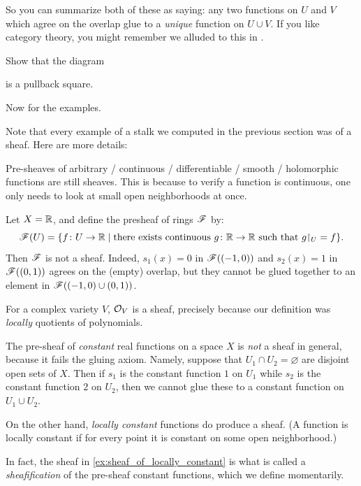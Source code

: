 So you can summarize both of these as saying:
any two functions on $U$ and $V$
which agree on the overlap
glue to a \emph{unique} function on $U \cup V$.
If you like category theory,
you might remember we alluded to this in .
\begin{exercise}
	Show that the diagram
	\begin{center}
	\end{center}
	is a pullback square.
\end{exercise}

Now for the examples.
\begin{example}
	Note that every example of a stalk we computed
	in the previous section was of a sheaf.
	Here are more details:
	\begin{enumerate}[(a)]
		\ii Pre-sheaves of arbitrary / continuous / differentiable / smooth
		/ holomorphic functions are still sheaves.
		This is because to verify a function is continuous,
		one only needs to look at small open neighborhoods at once.

		\ii Let $X = \mathbb R$, and define the presheaf of rings $\mathscr F$ by:
		\[
			\SF(U) = \{ f \colon U \to \RR \mid \text{there exists continuous $g
			\colon \RR \to \RR$ such that $g\restrict{U} = f$} \}.
		\]
		Then $\mathscr F$ is not a sheaf. Indeed, $s_1(x) = 0$ in $\mathscr F((-1, 0))$
		and $s_2(x) = 1$ in $\mathscr F((0, 1))$ agrees on the (empty) overlap,
		but they cannot be glued together to an element in $\mathscr F((-1, 0) \cup(0,
		1))$.

		\ii For a complex variety $V$, $\mathcal O_V$ is a sheaf,
		precisely because our definition was \emph{locally} quotients
		of polynomials.

		\ii The pre-sheaf of \emph{constant} real functions on a space $X$
		is \emph{not} a sheaf in general, because it fails the gluing axiom.
		Namely, suppose that $U_1 \cap U_2 = \varnothing$
		are disjoint open sets of $X$.
		Then if $s_1$ is the constant function $1$ on $U_1$
		while $s_2$ is the constant function $2$ on $U_2$,
		then we cannot glue these to a constant function on $U_1 \cup U_2$.

		\ii \label{ex:sheaf_of_locally_constant} On the other hand,
		\emph{locally constant} functions
		do produce a sheaf. (A function is locally constant
		if for every point it is constant on some open neighborhood.)
	\end{enumerate}
	In fact, the sheaf in \ref{ex:sheaf_of_locally_constant} is what is called
	a \emph{sheafification}
	of the pre-sheaf constant functions, which we define momentarily.
\end{example}

